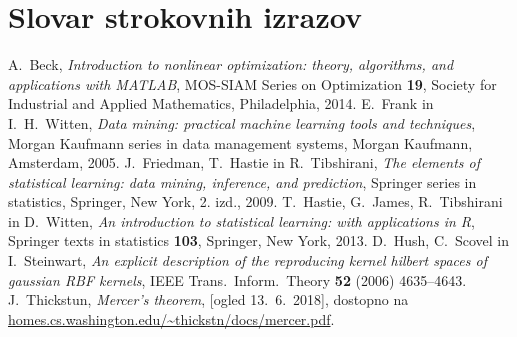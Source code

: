 \documentclass[mat1]{fmfdelo}
\begin{document}
\section*{Slovar strokovnih izrazov}


\begin{thebibliography}{99}


A.~Beck, \emph{Introduction to nonlinear optimization: theory, algorithms, and applications with MATLAB}, MOS-SIAM Series on Optimization \textbf{19}, Society for Industrial and Applied Mathematics, 	Philadelphia, 2014.
E.~Frank in I.~H.~Witten, \emph{Data mining: practical machine learning tools and techniques}, Morgan Kaufmann series in data management systems, Morgan Kaufmann, Amsterdam, 2005.
J.~Friedman, T.~Hastie in  R.~Tibshirani, \emph{The elements of statistical learning: data mining, inference, and prediction}, Springer series in statistics, Springer, New York, 2. izd., 2009.
T.~Hastie, G.~James, R.~Tibshirani in D.~Witten, \emph{An introduction to statistical learning: with applications in R}, Springer texts in statistics \textbf{103}, Springer, New York, 2013. 
D.~Hush, C.~Scovel in I.~Steinwart, \emph{An explicit description of the reproducing kernel hilbert spaces of gaussian RBF kernels}, IEEE Trans.\ Inform.\ Theory \textbf{52} (2006) 4635--4643.
J.~Thickstun, \emph{Mercer's theorem}, [ogled 13.~6.~2018], dostopno na \url{homes.cs.washington.edu/~thickstn/docs/mercer.pdf}.



\end{thebibliography}
\end{document}
